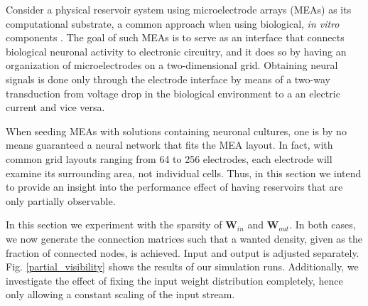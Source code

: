 Consider a physical reservoir system using microelectrode arrays (MEAs) as its
computational substrate, a common approach when using biological, \textit{in
vitro} components \cite{aaser_towards_2017}. The goal of such MEAs is to serve
as an interface that connects biological neuronal activity to electronic
circuitry, and it does so by having an organization of microelectrodes on a
two-dimensional grid. Obtaining neural signals is done only through the
electrode interface by means of a two-way transduction from voltage drop in the
biological environment to a an electric current and vice versa.

When seeding MEAs with solutions containing neuronal cultures, one is by no
means guaranteed a neural network that fits the MEA layout. In fact, with common
grid layouts ranging from 64 to 256 electrodes, each electrode will examine its
surrounding area, not individual cells. Thus, in this section we intend to
provide an insight into the performance effect of having reservoirs that are
only partially observable.

In this section we experiment with the sparsity of $\mathbf{W}_{in}$ and
$\mathbf{W}_{out}$. In both cases, we now generate the connection matrices such
that a wanted density, given as the fraction of connected nodes, is
achieved. Input and output is adjusted separately. Fig. \ref{partial_visibility}
shows the results of our simulation runs. Additionally, we investigate the
effect of fixing the input weight distribution completely, hence only allowing a
constant scaling of the input stream.

